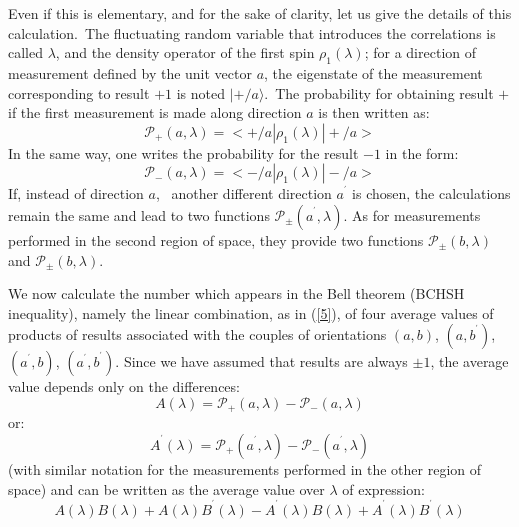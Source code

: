 \documentclass[12pt,onecolumn]{article}%
\begin{document}
Even if this is elementary, and for the sake of clarity, let us give the
details of this calculation.\ The fluctuating random variable that introduces
the correlations is called $\lambda$, and the density operator of the first
spin $\rho_{1}(\lambda)$; for a direction of measurement defined by the unit
vector $a$, the eigenstate of the measurement corresponding to result $+1$ is
noted $|+/a\rangle$.\ The probability for obtaining result $+$ if the first
measurement is made along direction $a$ is then written as:
\begin{equation}
\mathcal{P}_{+}(a,\lambda)=<+/a|\rho_{1}(\lambda)|+/a> \label{aa1}%
\end{equation}
In the same way, one writes the probability for the result $-1$ in the form:
\begin{equation}
\mathcal{P}_{-}(a,\lambda)=<-/a|\rho_{1}(\lambda)|-/a> \label{aa2}%
\end{equation}
If, instead of direction $a$, \ another different direction $a^{^{\prime}}$ is
chosen, the calculations remain the same and lead to two functions
$\mathcal{P}_{\pm}(a^{^{\prime}},\lambda)$. As for measurements performed in
the second region of space, they provide two functions $\mathcal{P}_{\pm
}(b,\lambda)$ and $\mathcal{P}_{\pm}(b,\lambda)$.

We now calculate the number which appears in the Bell theorem (BCHSH
inequality), namely the linear combination, as in (\ref{5}), of four average
values of products of results associated with the couples of orientations
$(a,b)$, $(a,b^{^{\prime}})$, $(a^{^{\prime}},b)$, $(a^{^{\prime}}%
,b^{^{\prime}})$. Since we have assumed that results are always $\pm1$, the
average value depends only on the differences:
\begin{equation}
A(\lambda)=\mathcal{P}_{+}(a,\lambda)-\mathcal{P}_{-}(a,\lambda) \label{aa3}%
\end{equation}
or:
\begin{equation}
A^{^{\prime}}(\lambda)=\mathcal{P}_{+}(a^{^{\prime}},\lambda)-\mathcal{P}%
_{-}(a^{^{\prime}},\lambda) \label{aa4}%
\end{equation}
(with similar notation for the measurements performed in the other region of
space) and can be written as the average value over $\lambda$ of expression:
\begin{equation}
A(\lambda)B(\lambda)+A(\lambda)B^{^{\prime}}(\lambda)-A^{^{\prime}}%
(\lambda)B(\lambda)+A^{^{\prime}}(\lambda)B^{^{\prime}}(\lambda) \label{aa5}%
\end{equation}
\end{document}
